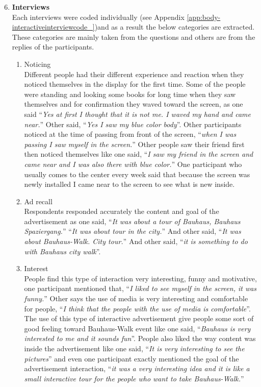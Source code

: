 \begin{enumerate}
\setcounter{enumi}{5}
\item \textbf{Interviews} \\
Each interviews were coded individually (see Appendix \ref{app:body-interactiveinterviewcode_})and as a result the below categories are extracted. These categories are mainly taken from the questions and others are from the replies of the participants. 

\begin{enumerate}

\item Noticing \\
    Different people had their different experience and reaction when they noticed themselves in the display for the first time. Some of the people were standing and looking some books for long time when they saw themselves and for confirmation they waved toward the screen, as one said ``\emph{Yes at first I thought that it is not me. I waved my hand and came near.}'' Other said, ``\emph{Yes I saw my blue color body}''. Other participants noticed at the time of passing from front of the screen, ``\emph{when I was passing I saw myself in the screen.}'' Other people saw their friend first then noticed themselves like one said, ``\emph{I saw my friend in the screen and came near and I was also there with blue color.}'' One participant who usually comes to the center every week said that because the screen was newly installed I came near to the screen to see what is new inside.

\item Ad recall \\
    Respondents responded accurately the content and goal of the advertisement as one said, ``\emph{It was about a tour of Bauhaus, Bauhaus Spaziergang.}'' ``\emph{It was about tour in the city.}'' And other said, ``\emph{It was about Bauhaus-Walk. City tour.}'' And other said, ``\emph{it is something to do with Bauhaus city walk}''.

\item Interest \\
    People find this type of interaction very interesting, funny and motivative, one participant mentioned that, ``\emph{I liked to see myself in the screen, it was funny.}'' Other says the use of media is very interesting and comfortable for people, ``\emph{I think that the people with the use of media is comfortable}''. The use of this type of interactive advertisement give people some sort of good feeling toward Bauhaus-Walk event like one said, ``\emph{Bauhaus is very interested to me and it sounds fun}''. People also liked the way content was inside the advertisement like one said, ``\emph{It is very interesting to see the pictures}'' and even one participant exactly mentioned the goal of the advertisement interaction, ``\emph{it was a very interesting idea and it is like a small interactive tour for the people who want to take Bauhaus-Walk.}''


\end{enumerate}
\end{enumerate}
